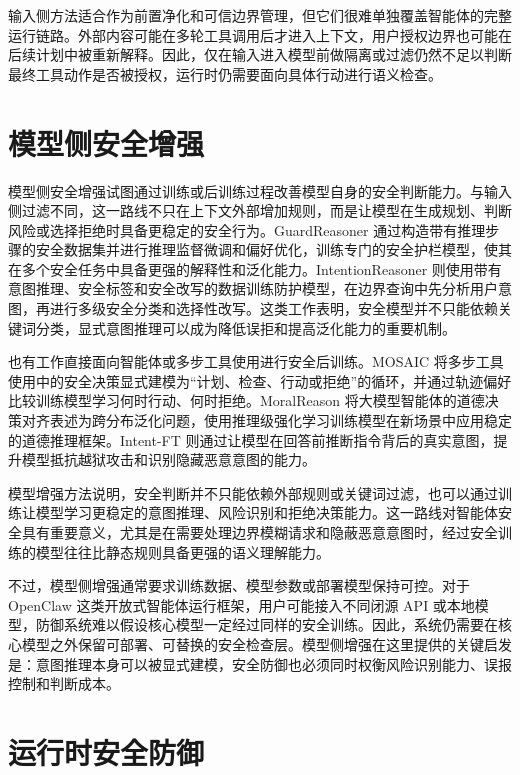 输入侧方法适合作为前置净化和可信边界管理，但它们很难单独覆盖智能体的完整运行链路。外部内容可能在多轮工具调用后才进入上下文，用户授权边界也可能在后续计划中被重新解释。因此，仅在输入进入模型前做隔离或过滤仍然不足以判断最终工具动作是否被授权，运行时仍需要面向具体行动进行语义检查。

\section{模型侧安全增强}

模型侧安全增强试图通过训练或后训练过程改善模型自身的安全判断能力。与输入侧过滤不同，这一路线不只在上下文外部增加规则，而是让模型在生成规划、判断风险或选择拒绝时具备更稳定的安全行为。GuardReasoner 通过构造带有推理步骤的安全数据集并进行推理监督微调和偏好优化，训练专门的安全护栏模型，使其在多个安全任务中具备更强的解释性和泛化能力\cite{liu2025guardreasoner}。IntentionReasoner 则使用带有意图推理、安全标签和安全改写的数据训练防护模型，在边界查询中先分析用户意图，再进行多级安全分类和选择性改写\cite{shen2025intentionreasoner}。这类工作表明，安全模型并不只能依赖关键词分类，显式意图推理可以成为降低误拒和提高泛化能力的重要机制。

也有工作直接面向智能体或多步工具使用进行安全后训练。MOSAIC 将多步工具使用中的安全决策显式建模为“计划、检查、行动或拒绝”的循环，并通过轨迹偏好比较训练模型学习何时行动、何时拒绝\cite{agarwal2026learning}。MoralReason 将大模型智能体的道德决策对齐表述为跨分布泛化问题，使用推理级强化学习训练模型在新场景中应用稳定的道德推理框架\cite{an2026moralreason}。Intent-FT 则通过让模型在回答前推断指令背后的真实意图，提升模型抵抗越狱攻击和识别隐藏恶意意图的能力\cite{yeo2025mitigating}。

模型增强方法说明，安全判断并不只能依赖外部规则或关键词过滤，也可以通过训练让模型学习更稳定的意图推理、风险识别和拒绝决策能力。这一路线对智能体安全具有重要意义，尤其是在需要处理边界模糊请求和隐蔽恶意意图时，经过安全训练的模型往往比静态规则具备更强的语义理解能力。

不过，模型侧增强通常要求训练数据、模型参数或部署模型保持可控。对于 OpenClaw 这类开放式智能体运行框架，用户可能接入不同闭源 API 或本地模型，防御系统难以假设核心模型一定经过同样的安全训练。因此，系统仍需要在核心模型之外保留可部署、可替换的安全检查层。模型侧增强在这里提供的关键启发是：意图推理本身可以被显式建模，安全防御也必须同时权衡风险识别能力、误报控制和判断成本。

\section{运行时安全防御}

